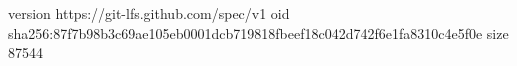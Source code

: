 version https://git-lfs.github.com/spec/v1
oid sha256:87f7b98b3c69ae105eb0001dcb719818fbeef18c042d742f6e1fa8310c4e5f0e
size 87544
